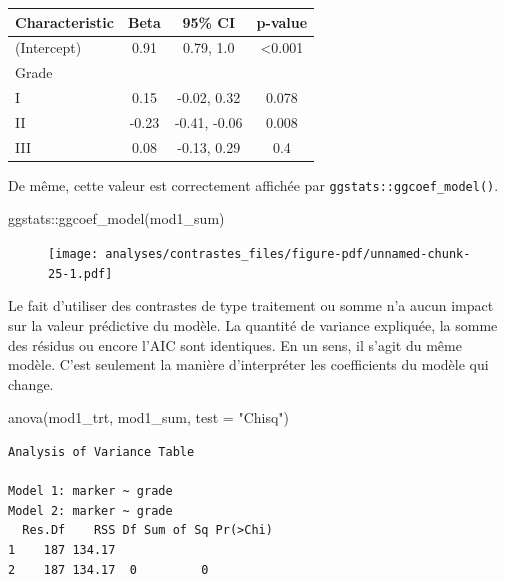 \documentclass[
  letterpaper,
  DIV=11,
  numbers=noendperiod,
  oneside]{scrreprt}
\newenvironment{Shaded}{\begin{snugshade}}{\end{snugshade}}
\newcommand{\AttributeTok}[1]{\textcolor[rgb]{0.40,0.45,0.13}{#1}}
\newcommand{\FunctionTok}[1]{\textcolor[rgb]{0.28,0.35,0.67}{#1}}
\newcommand{\NormalTok}[1]{\textcolor[rgb]{0.00,0.23,0.31}{#1}}
\newcommand{\SpecialCharTok}[1]{\textcolor[rgb]{0.37,0.37,0.37}{#1}}
\newcommand{\StringTok}[1]{\textcolor[rgb]{0.13,0.47,0.30}{#1}}
\begin{document}
\begin{longtable}[]{@{}lccc@{}}
\toprule()
\textbf{Characteristic} & \textbf{Beta} & \textbf{95\% CI} &
\textbf{p-value} \\
\midrule()
\endhead
(Intercept) & 0.91 & 0.79, 1.0 & \textless0.001 \\
Grade & & & \\
I & 0.15 & -0.02, 0.32 & 0.078 \\
II & -0.23 & -0.41, -0.06 & 0.008 \\
III & 0.08 & -0.13, 0.29 & 0.4 \\
\bottomrule()
\end{longtable}

De même, cette valeur est correctement affichée par
\texttt{ggstats::ggcoef\_model()}.

\begin{Shaded}
\begin{Highlighting}[]
\NormalTok{ggstats}\SpecialCharTok{::}\FunctionTok{ggcoef\_model}\NormalTok{(mod1\_sum)}
\end{Highlighting}
\end{Shaded}

\begin{figure}[H]

{\centering \texttt{[image: analyses/contrastes\_files/figure-pdf/unnamed-chunk-25-1.pdf]}

}

\end{figure}

Le fait d'utiliser des contrastes de type traitement ou somme n'a aucun
impact sur la valeur prédictive du modèle. La quantité de variance
expliquée, la somme des résidus ou encore l'AIC sont identiques. En un
sens, il s'agit du même modèle. C'est seulement la manière d'interpréter
les coefficients du modèle qui change.

\begin{Shaded}
\begin{Highlighting}[]
\FunctionTok{anova}\NormalTok{(mod1\_trt, mod1\_sum, }\AttributeTok{test =} \StringTok{"Chisq"}\NormalTok{)}
\end{Highlighting}
\end{Shaded}

\begin{verbatim}
Analysis of Variance Table

Model 1: marker ~ grade
Model 2: marker ~ grade
  Res.Df    RSS Df Sum of Sq Pr(>Chi)
1    187 134.17                      
2    187 134.17  0         0         
\end{verbatim}
\end{document}
